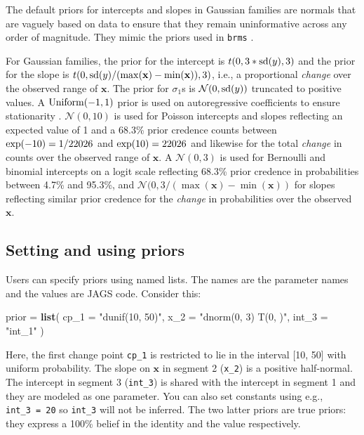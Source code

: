 \documentclass[
  american,
]{article}
\newenvironment{Shaded}{\begin{snugshade}}{\end{snugshade}}
\newcommand{\DataTypeTok}[1]{\textcolor[rgb]{0.13,0.29,0.53}{#1}}
\newcommand{\KeywordTok}[1]{\textcolor[rgb]{0.13,0.29,0.53}{\textbf{#1}}}
\newcommand{\NormalTok}[1]{#1}
\newcommand{\StringTok}[1]{\textcolor[rgb]{0.31,0.60,0.02}{#1}}
\begin{document}
The default priors for intercepts and slopes in Gaussian families are normals that are vaguely based on data to ensure that they remain uninformative across any order of magnitude. They mimic the priors used in \texttt{brms} \citep{burkner2017}.

For Gaussian families, the prior for the intercept is \(t(0, 3* {\rm sd}(y), 3)\) and the prior for the slope is \(t(0, {\rm sd}(y) / (\max(\mathbf{x}) - \min(\mathbf{x})), 3)\), i.e., a proportional \emph{change} over the observed range of \(\mathbf{x}\). The prior for \(\sigma_1\)s is \(\mathcal{N}(0, {\rm sd}(y))\) truncated to positive values. A \({\rm Uniform}(-1, 1)\) prior is used on autoregressive coefficients to ensure stationarity \citep{fuller1981}. \(\mathcal{N}(0, 10)\) is used for Poisson intercepts and slopes reflecting an expected value of 1 and a 68.3\% prior credence counts between \({\rm exp}(-10) = 1 / 22026\) and \({\rm exp}(10) = 22026\) and likewise for the total \emph{change} in counts over the observed range of \(\mathbf{x}\). A \(\mathcal{N}(0, 3)\) is used for Bernoulli and binomial intercepts on a logit scale reflecting 68.3\% prior credence in probabilities between 4.7\% and 95.3\%, and \(\mathcal{N}(0, 3 / (\max(\mathbf{x}) - \min(\mathbf{x}))\) for slopes reflecting similar prior credence for the \emph{change} in probabilities over the observed \(\mathbf{x}\).

\hypertarget{priors_api}{%
\subsection{Setting and using priors}\label{priors_api}}

Users can specify priors using named lists. The names are the parameter names and the values are JAGS code. Consider this:

\begin{Shaded}
\begin{Highlighting}[]
\NormalTok{prior =}\StringTok{ }\KeywordTok{list}\NormalTok{(}
  \DataTypeTok{cp_1 =} \StringTok{"dunif(10, 50)"}\NormalTok{,}
  \DataTypeTok{x_2 =} \StringTok{"dnorm(0, 3) T(0, )"}\NormalTok{,}
  \DataTypeTok{int_3 =} \StringTok{"int_1"}
\NormalTok{)}
\end{Highlighting}
\end{Shaded}

Here, the first change point \texttt{cp\_1} is restricted to lie in the interval {[}10, 50{]} with uniform probability. The slope on \(\mathbf{x}\) in segment 2 (\texttt{x\_2}) is a positive half-normal. The intercept in segment 3 (\texttt{int\_3}) is shared with the intercept in segment 1 and they are modeled as one parameter. You can also set constants using e.g., \texttt{int\_3\ =\ 20} so \texttt{int\_3} will not be inferred. The two latter priors are true priors: they express a 100\% belief in the identity and the value respectively.
\end{document}

